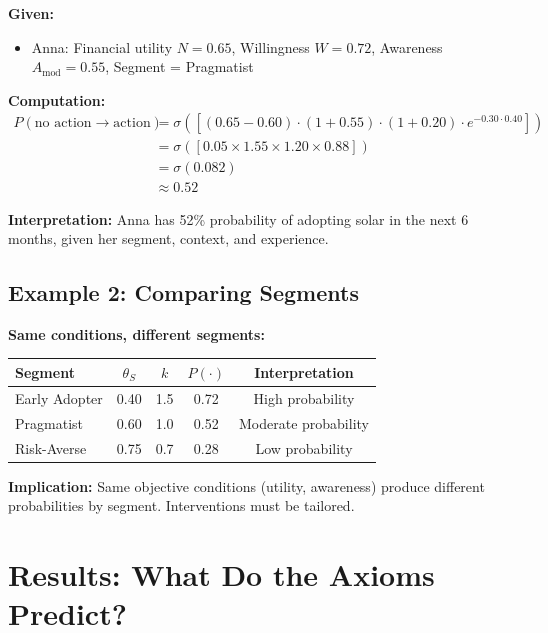 \documentclass[11pt, a4paper]{article}
\begin{document}
\textbf{Given:}
\begin{itemize}[nosep]
    \item Anna: Financial utility $N = 0.65$, Willingness $W = 0.72$, Awareness $A_{\text{mod}} = 0.55$, Segment = Pragmatist
\end{itemize}

\textbf{Computation:}
\begin{align}
P(\text{no action} \to \text{action}) &= \sigma\left(
    [(0.65 - 0.60) \cdot (1 + 0.55) \cdot (1 + 0.20) \cdot e^{-0.30 \cdot 0.40}]
\right) \\
&= \sigma\left( [0.05 \times 1.55 \times 1.20 \times 0.88] \right) \\
&= \sigma(0.082) \\
&\approx 0.52
\end{align}

\textbf{Interpretation:} Anna has 52\% probability of adopting solar in the next 6 months, given her segment, context, and experience.

\subsection{Example 2: Comparing Segments}

\textbf{Same conditions, different segments:}

\begin{center}
\begin{tabular}{|l|c|c|c|c|}
\hline
\textbf{Segment} & $\theta_S$ & $k$ & $P(\cdot)$ & Interpretation \\
\hline
Early Adopter & 0.40 & 1.5 & 0.72 & High probability \\
Pragmatist & 0.60 & 1.0 & 0.52 & Moderate probability \\
Risk-Averse & 0.75 & 0.7 & 0.28 & Low probability \\
\hline
\end{tabular}
\end{center}

\textbf{Implication:} Same objective conditions (utility, awareness) produce different probabilities by segment. Interventions must be tailored.


\section{Results: What Do the Axioms Predict?}
\end{document}
